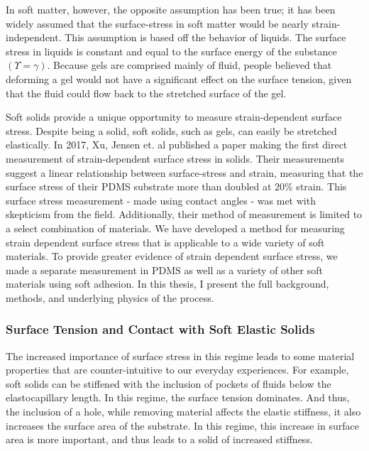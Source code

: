 In soft matter, however, the opposite assumption has been true; it has been widely assumed that the surface-stress in soft matter would be nearly strain-independent. This assumption is based off the behavior of liquids. The surface stress in liquids is constant and equal to the surface energy of the substance $(\Upsilon = \gamma)$. Because gels are comprised mainly of fluid, people believed that deforming a gel would not have a significant effect on the surface tension, given that the fluid could flow back to the stretched surface of the gel. 


Soft solids provide a unique opportunity to measure strain-dependent surface stress. Despite being a solid, soft solids, such as gels, can easily be stretched elastically. In 2017, Xu, Jensen et. al published a paper \cite{xu2017direct} making the first direct measurement of strain-dependent surface stress in solids. Their measurements suggest a linear relationship between surface-stress and strain, measuring that the surface stress of their PDMS substrate more than doubled at 20\% strain. This surface stress measurement - made using contact angles - was met with skepticism from the field. Additionally, their method of measurement is limited to a select combination of materials. We have developed a method for measuring strain dependent surface stress that is applicable to a wide variety of soft materials. To provide greater evidence of strain dependent surface stress, we made a separate measurement in PDMS as well as a variety of other soft materials using soft adhesion. In this thesis, I present the full background, methods, and underlying physics of the process.    




 



\subsubsection{Surface Tension and Contact with Soft Elastic Solids}

The increased importance of surface stress in this regime leads to some material properties that are counter-intuitive to our everyday experiences. For example, soft solids can be stiffened with the inclusion of pockets of fluids below the elastocapillary length. In this regime, the surface tension dominates. And thus, the inclusion of a hole, while removing material affects the elastic stiffness, it also increases the surface area of the substrate. In this regime, this increase in surface area is more important, and thus leads to a solid of increased stiffness.

